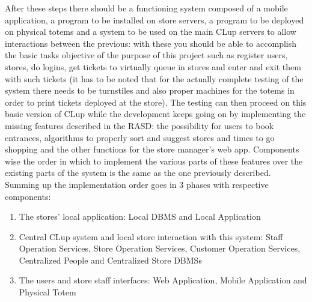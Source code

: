 After these steps there should be a functioning system composed of a mobile application, a program to be installed on store servers, a program to be deployed on physical totems and a system to be used on the main CLup servers to allow interactions between the previous: with these you should be able to accomplish the basic tasks objective of the purpose of this project such as register users, stores, do logins, get tickets to virtually queue in stores and enter and exit them with such tickets (it has to be noted that for the actually complete testing of the system there needs to be turnstiles and also proper machines for the totems in order to print tickets deployed at the store). The testing can then proceed on this basic version of CLup while the development keeps going on by implementing the missing features described in the RASD: the possibility for users to book entrances, algorithms to properly sort and suggest stores and times to go shopping and the other functions for the store manager’s web app.
Components wise the order in which to implement the various parts of these features over the existing parts of the system is the same as the one previously described.
Summing up the implementation order goes in 3 phases with respective components: \begin{enumerate}
	\item The stores’ local application: Local DBMS and Local Application
	\item Central CLup system and local store interaction with this system: Staff Operation Services, Store Operation Services, Customer Operation Services, Centralized People and Centralized Store DBMSs
	\item The users and store staff interfaces: Web Application, Mobile Application and Physical Totem
\end{enumerate}




